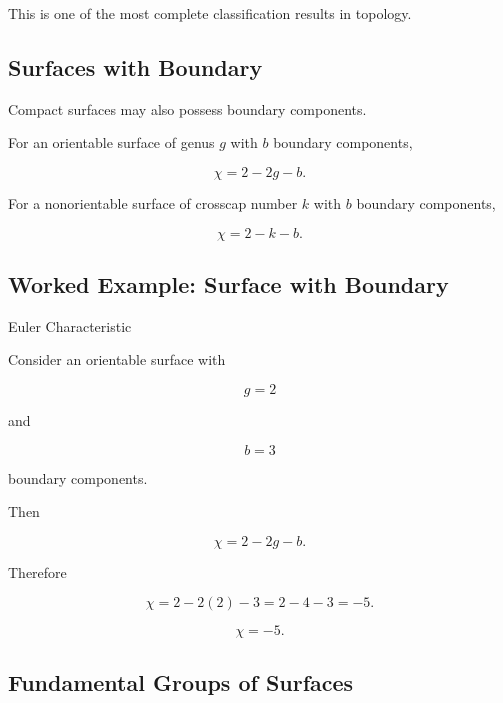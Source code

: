 This is one of the most complete classification results in topology.

\subsection{Surfaces with Boundary}
\label{subsec:surfaces-with-boundary}

Compact surfaces may also possess boundary components.

For an orientable surface of genus \(g\) with \(b\) boundary components,

\[
\boxed{
\chi=2-2g-b.
}
\]

For a nonorientable surface of crosscap number \(k\) with \(b\) boundary
components,

\[
\boxed{
\chi=2-k-b.
}
\]

\subsection{Worked Example: Surface with Boundary}
\label{subsec:worked-surface-boundary}

\begin{workedexamplebox}{Euler Characteristic}

Consider an orientable surface with

\[
g=2
\]

and

\[
b=3
\]

boundary components.

Then

\[
\chi=2-2g-b.
\]

Therefore

\[
\chi
=
2-2(2)-3
=
2-4-3
=
-5.
\]

\begin{answerbox}
\[
\boxed{
\chi=-5.
}
\]
\end{answerbox}
\end{workedexamplebox}

\subsection{Fundamental Groups of Surfaces}
\label{subsec:fundamental-groups-surfaces}

